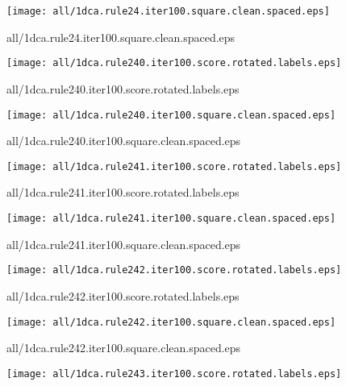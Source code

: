 \documentclass{article}
\begin{document}
\begin{center}
\begin{minipage}{\textwidth}
\texttt{[image: all/1dca.rule24.iter100.square.clean.spaced.eps]}
\end{minipage}
\end{center}
{\footnotesize all/1dca.rule24.iter100.square.clean.spaced.eps}
\begin{center}
\begin{minipage}{\textwidth}
\texttt{[image: all/1dca.rule240.iter100.score.rotated.labels.eps]}
\end{minipage}
\end{center}
{\footnotesize all/1dca.rule240.iter100.score.rotated.labels.eps}
\begin{center}
\begin{minipage}{\textwidth}
\texttt{[image: all/1dca.rule240.iter100.square.clean.spaced.eps]}
\end{minipage}
\end{center}
{\footnotesize all/1dca.rule240.iter100.square.clean.spaced.eps}
\begin{center}
\begin{minipage}{\textwidth}
\texttt{[image: all/1dca.rule241.iter100.score.rotated.labels.eps]}
\end{minipage}
\end{center}
{\footnotesize all/1dca.rule241.iter100.score.rotated.labels.eps}
\begin{center}
\begin{minipage}{\textwidth}
\texttt{[image: all/1dca.rule241.iter100.square.clean.spaced.eps]}
\end{minipage}
\end{center}
{\footnotesize all/1dca.rule241.iter100.square.clean.spaced.eps}
\begin{center}
\begin{minipage}{\textwidth}
\texttt{[image: all/1dca.rule242.iter100.score.rotated.labels.eps]}
\end{minipage}
\end{center}
{\footnotesize all/1dca.rule242.iter100.score.rotated.labels.eps}
\begin{center}
\begin{minipage}{\textwidth}
\texttt{[image: all/1dca.rule242.iter100.square.clean.spaced.eps]}
\end{minipage}
\end{center}
{\footnotesize all/1dca.rule242.iter100.square.clean.spaced.eps}
\begin{center}
\begin{minipage}{\textwidth}
\texttt{[image: all/1dca.rule243.iter100.score.rotated.labels.eps]}
\end{minipage}
\end{center}
\end{document}
